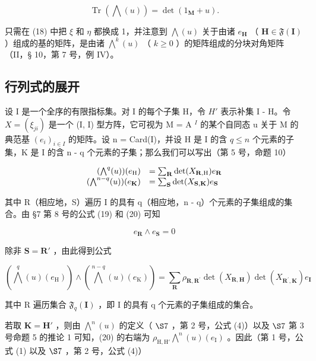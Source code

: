 \[
\operatorname{Tr} (\bigwedge (u)) = \det (1 _ {\mathbf {M}} + u).\tag{19}
\]

只需在 (18) 中把 \(\xi\) 和 \(\eta\) 都换成 1，并注意到 \(\bigwedge(u)\) 关于由诸 \(e_{\mathbf{H}}\) （ \(\mathbf{H} \in \mathfrak{F}(\mathbf{I})\) ）组成的基的矩阵，是由诸 \(\bigwedge^{k}(u)\) （ \(k \geqslant 0\) ）的矩阵组成的分块对角矩阵（II，§ 10，第 7 号，例 IV）。

\subsection{行列式的展开}

设 I 是一个全序的有限指标集。对 I 的每个子集 H，令 \(H'\) 表示补集 I - H。令 \(X = (\xi_{ji})\) 是一个 (I, I) 型方阵，它可视为 M = A \(^{I}\) 的某个自同态 u 关于 M 的典范基 \((e_{i})_{i \in I}\) 的矩阵。设 n = Card(I)，并设 H 是 I 的含 \(q \leqslant n\) 个元素的子集，K 是 I 的含 n - q 个元素的子集；那么我们可以写出（第 5 号，命题 10）

\[
\begin{array}{r l} (\bigwedge^ {q} (u)) (e _ {\mathrm{H}}) & = \sum_ {\mathbf {R}} \det (X _ {\mathbf {R}, \mathrm{H}}) e _ {\mathbf {R}} \\ (\bigwedge^ {n - q} (u)) (e _ {\mathbf {K}}) & = \sum_ {\mathbf {S}} \det (X _ {\mathbf {S}, \mathbf {K}}) e _ {\mathbf {S}} \end{array}
\]

其中 R（相应地，S）遍历 I 的具有 q（相应地，n - q）个元素的子集组成的集合。由 §7 第 8 号的公式 (19) 和 (20) 可知

\[
e _ {\mathbf {R}} \wedge e _ {\mathbf {S}} = 0
\]

除非 \(\mathbf{S} = \mathbf{R}'\) ，由此得到公式

\[
\left(\bigwedge^ {q} (u) \left(e _ {\mathrm{H}}\right)\right) \wedge \left(\bigwedge^ {n - q} (u) \left(e _ {\mathrm{K}}\right)\right) = \sum_ {\mathbf {R}} \rho_ {\mathbf {R}, \mathbf {R} ^ {\prime}} \det \left(X _ {\mathbf {R}, \mathbf {H}}\right) \det \left(X _ {\mathbf {R} ^ {\prime}, \mathbf {K}}\right) e _ {\mathbf {I}}\tag{20}
\]

其中 R 遍历集合 \(\mathfrak{F}_{q}(\mathbf{I})\) ，即 I 的具有 q 个元素的子集组成的集合。

若取 \(\mathbf{K} = \mathbf{H}'\) ，则由 \(\bigwedge^{n}(u)\) 的定义（ \(\S 7\) ，第 2 号，公式 (4)）以及 \(\S 7\) 第 3 号命题 5 的推论 1 可知，(20) 的右端为 \(\rho_{\mathrm{H},\mathrm{H}'}\bigwedge^{n}(u)(e_{\mathrm{I}})\) 。因此（第 1 号，公式 (1) 以及 \(\S 7\) ，第 2 号，公式 (4)）

